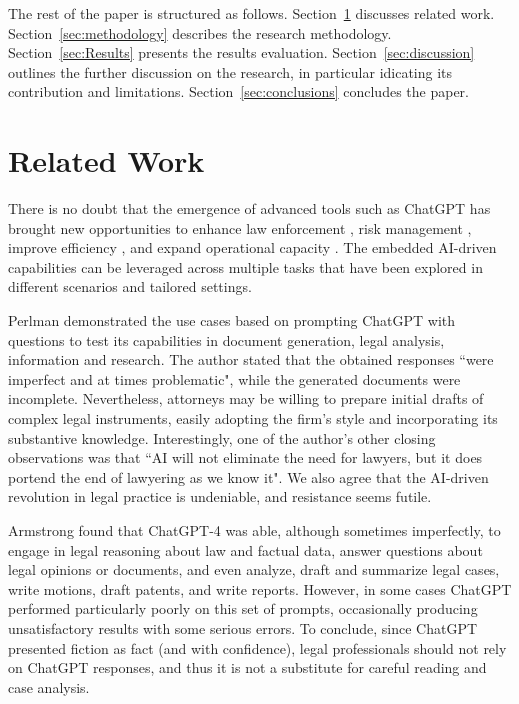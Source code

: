 \documentclass[preprint,12pt,number]{elsarticle}
\begin{document}
The rest of the paper is structured as follows. 
Section~\ref{sec:related-work} discusses related work.
Section~\ref{sec:methodology} describes the research methodology.
Section~\ref{sec:Results} presents the results evaluation.
Section~\ref{sec:discussion} outlines the further discussion on the research, in particular idicating its contribution and limitations.
Section~\ref{sec:conclusions} concludes the paper.

\section{Related Work}
\label{sec:related-work}
There is no doubt that the emergence of advanced tools such as ChatGPT has brought new opportunities to enhance law enforcement \cite{pandey2024exploring}, risk management \cite{halford2024using}, improve efficiency \cite{raj2023analyzing}, and expand operational capacity \cite{chen2024antecedents}. The embedded AI-driven capabilities can be leveraged across multiple tasks that have been explored in different scenarios and tailored settings.

Perlman \cite{perlman2023implications} demonstrated the use cases based on prompting ChatGPT with questions to test its capabilities in document generation, legal analysis, information and research. The author stated that the obtained responses ``were imperfect and at times problematic", while the generated documents were incomplete. Nevertheless, attorneys may be willing to prepare initial drafts of complex legal instruments, easily adopting the firm's style and incorporating its substantive knowledge. Interestingly, one of the author's other closing observations was that ``AI will not eliminate the need for lawyers, but it does portend the end of lawyering as we know it". We also agree that the AI-driven revolution in legal practice is undeniable, and resistance seems futile.

Armstrong \cite{armstrong2023s} found that ChatGPT-4 was able, although sometimes imperfectly, to engage in legal reasoning about law and factual data, answer questions about legal opinions or documents, and even analyze, draft and summarize legal cases, write motions, draft patents, and write reports. However, in some cases ChatGPT performed particularly poorly on this set of prompts, occasionally producing unsatisfactory results with some serious errors. To conclude, since ChatGPT presented fiction as fact (and with confidence), legal professionals should not rely on ChatGPT responses, and thus it is not a substitute for careful reading and case analysis. 
\end{document}
